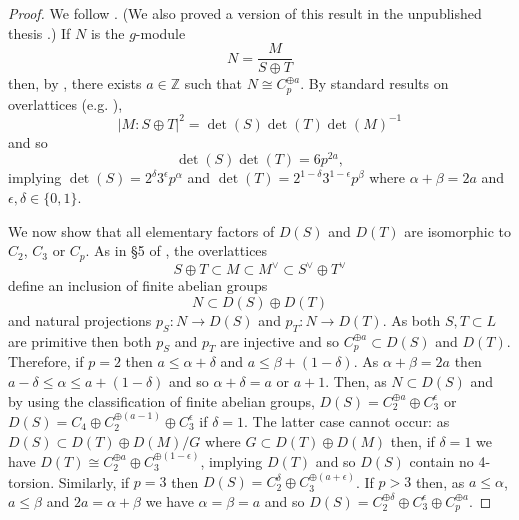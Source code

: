 \documentclass[12pt, a4paper]{article}
\newcommand{\ZZ}{\mathbb{Z}}
\newcommand{\opn}{\operatorname}
\newcommand{\op}{\oplus}
\begin{document}
\begin{proof}
  We follow \cite[Lemma 5.5]{SmithTheory}.
  (We also proved a version of this result in the unpublished  thesis  \cite{DawesThesis}.)
If $N$ is the $g$-module
\[
N = \frac{M}{S \op T}
\]
then, by \cite[Lemma 4.3/Remark 4.4]{SmithTheory}, there exists $a \in \ZZ$ such that $N \cong C_p^{\op a}$.
By standard results on overlattices (e.g. \cite[Lemma 2.1, Chapter I.1]{CCS}),
\[
\vert M : S \op T \vert^2 = \opn{det}(S) \opn{det}(T) \opn{det}(M)^{-1}
\]
and so
\begin{equation}\label{detTdetS}
\opn{det}(S) \opn{det}(T) = 6p^{2a},
\end{equation}
implying $\opn{det}(S) = 2^{\delta} 3^{\epsilon} p^{\alpha}$ and $\opn{det}(T) = 2^{1-\delta}3^{1-\epsilon}p^{\beta}$ where $\alpha+\beta = 2a$ and $\epsilon, \delta \in \{0, 1 \}$.

We now show that all elementary factors of $D(S)$ and $D(T)$ are isomorphic to $C_2$, $C_3$ or $C_p$. 
As in \S5 of \cite{Nikulin}, the overlattices
\[
S \op T \subset M \subset M^{\vee} \subset S^{\vee} \op T^{\vee}
\]
define an inclusion of finite abelian groups
\[
N \subset D(S) \op D(T)
\]
and natural projections $p_S:N \rightarrow D(S)$ and $p_T:N \rightarrow D(T)$.
As both $S,T \subset L$ are primitive then both $p_S$ and $p_T$ are injective \cite[p.111]{Nikulin} and so $C_p^{\op a} \subset D(S)$ and $D(T)$.
Therefore, if $p=2$ then $a \leq \alpha + \delta$ and $a \leq \beta + (1-\delta)$. 
As $\alpha + \beta = 2a$ then $a - \delta \leq \alpha \leq a + (1-\delta)$ and so $\alpha + \delta = a$ or $a+1$.
Then, as $N \subset D(S)$ and by using the classification of finite abelian groups, $D(S) = C_2^{\op a} \op C_3^{\epsilon}$ or $D(S) = C_4 \op C_2^{\op (a-1) } \op C_3^{\epsilon}$ if $\delta = 1$.
The latter case cannot occur: as $D(S) \subset D(T) \op D(M) / G$ where $G \subset D(T) \op D(M)$ then, if $\delta=1$ we have $D(T) \cong C_2^{\op a} \op C_3^{\op (1-\epsilon)}$, implying $D(T)$ and so $D(S)$ contain no 4-torsion.
Similarly, if $p=3$ then $D(S) = C_2^{\delta} \op C_3^{\op(a+\epsilon)}$.
If $p>3$ then, as $a \leq \alpha$, $a \leq \beta$ and $2a= \alpha + \beta$ we have $\alpha=\beta=a$ and so $D(S) = C_2^{\op \delta} \op C_3^{\epsilon} \op C_p^{\op a}$.


\end{proof}
\end{document}

